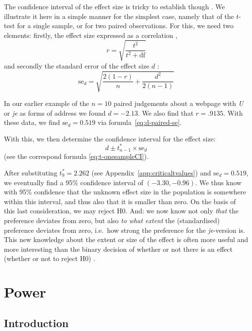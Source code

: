 \documentclass[
]{book}
\begin{document}
The confidence interval of the effect size is tricky to establish though
\citep{Naka07, Chen15}. We illustrate it here in a simple manner for
the simplest case, namely that of the \(t\)-test for a single sample,
or for two paired observations. For this, we need two elements:
firstly, the effect size expressed as a correlation \citep[ p.359, formula 12.1]{Rose08}, \[r = \sqrt{ \frac{t^2}{t^2+\textrm{df}} }\] and secondly
the standard error of the effect size \(d\) \citep[ p.600,
formula 18]{Naka07}:\\
\begin{equation}
  \label{eq:d-paired-se}
    \textrm{se}_d = \sqrt{ \frac{2(1-r)}{n} + \frac{d^2}{2(n-1)} }
\end{equation}

In
our earlier example of the \(n=10\) paired judgements about a webpage
with \emph{U} or \emph{je} as forms of address we found \(d=-2.13\). We also find
that \(r=.9135\). With these data, we find \(\textrm{se}_d = 0.519\) via
formula~\eqref{eq:d-paired-se}.

With this, we then determine the confidence interval for the
effect size:
\begin{equation}
   \label{eq:d-paired-CI}
    d \pm t^*_{n-1} \times \textrm{se}_d 
\end{equation}
(see the correspond
formula \eqref{eq:t-onesampleCI}).

After substituting \(t^*_9=2.262\) (see Appendix~\ref{app:criticaltvalues}) and
\(\textrm{se}_d = 0.519\), we eventually find a 95\% confidence interval of \((-3.30,-0.96)\).
We thus
know with 95\% confidence that the unknown effect size in the population
is somewhere within this interval, and thus also that it is smaller than
zero. On the basis of this last consideration, we may reject H0.
And: we now know not only \emph{that} the preference deviates from zero, but
also \emph{to what extent} the (standardised) preference deviates from zero,
i.e.~how strong the preference for the \emph{je}-version is. This new knowledge
about the extent or size of the effect is often more useful and more interesting
than the binary decision of whether or not there is an effect (whether or not
to reject H0) \citep{Cumm12}.

\hypertarget{ch:power}{%
\chapter{Power}\label{ch:power}}

\hypertarget{sec:power-introduction}{%
\section{Introduction}\label{sec:power-introduction}}
\end{document}
